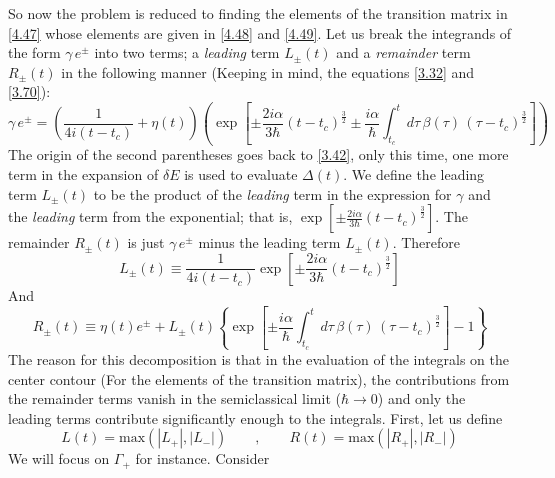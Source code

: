 \documentclass[12pt,a4paper]{article}
\begin{document}
	So now the problem is reduced to finding the elements of the transition matrix in \eqref{4.47} whose elements are given in \eqref{4.48} and \eqref{4.49}. Let us break the integrands of the form $\gamma\, e^{\pm}$ into two terms; a \emph{leading} term $L_{\pm}(t)$ and a \emph{remainder} term $R_{\pm}(t)$ in the following manner (Keeping in mind, the equations \eqref{3.32} and \eqref{3.70}):
	\begin{equation}
		\gamma\, e^{\pm} = \left( \dfrac{1}{4i \left( t - t_{c} \right)} + \eta(t) \right) \left( \exp \left[ \pm \frac{2i \alpha}{3\hbar} \left( t - t_{c} \right)^{\frac{3}{2}} \pm \frac{i\alpha}{\hbar} \int_{t_{c}}^{t} d\tau\, \beta(\tau)\, \left( \tau - t_{c} \right)^{\frac{3}{2}} \right] \right)
	\end{equation}
	The origin of the second parentheses goes back to \eqref{3.42}, only this time, one more term in the expansion of $\delta E$ is used to evaluate $\Delta(t)$. We define the leading term $L_{\pm}(t)$ to be the product of the \emph{leading} term in the expression for $\gamma$ and the \emph{leading} term from the exponential; that is, $\exp \left[ \pm \frac{2i \alpha}{3\hbar} \left( t - t_{c} \right)^{\frac{3}{2}} \right]$. The remainder $R_{\pm}(t)$ is just $\gamma\, e^{\pm}$ minus the leading term $L_{\pm}(t)$. Therefore
	\begin{equation}
		L_{\pm}(t) \equiv \dfrac{1}{4i \left( t - t_{c} \right)} \exp \left[ \pm \frac{2i \alpha}{3\hbar} \left( t - t_{c} \right)^{\frac{3}{2}} \right] \label{4.59}
	\end{equation}
	And
	\begin{equation}
		R_{\pm}(t) \equiv \eta(t) e^{\pm} + L_{\pm}(t) \left\{ \exp \left[ \pm \frac{i\alpha}{\hbar} \int_{t_{c}}^{t} d\tau\, \beta(\tau)\, \left( \tau - t_{c} \right)^{\frac{3}{2}} \right] - 1 \right\} \label{4.60}
	\end{equation}
	The reason for this decomposition is that in the evaluation of the integrals on the center contour (For the elements of the transition matrix), the contributions from the remainder terms vanish in the semiclassical limit ($\hbar \rightarrow 0$) and only the leading terms contribute significantly enough to the integrals. First, let us define
	\begin{equation}
		L(t) = \mathrm{max} \left( \left| L_{+} \right|, \left| L_{-} \right| \right) \qquad , \qquad R(t) = \mathrm{max} \left( \left| R_{+} \right|, \left| R_{-} \right| \right)
	\end{equation}
	We will focus on $\Gamma_{+}$ for instance. Consider
\end{document}
